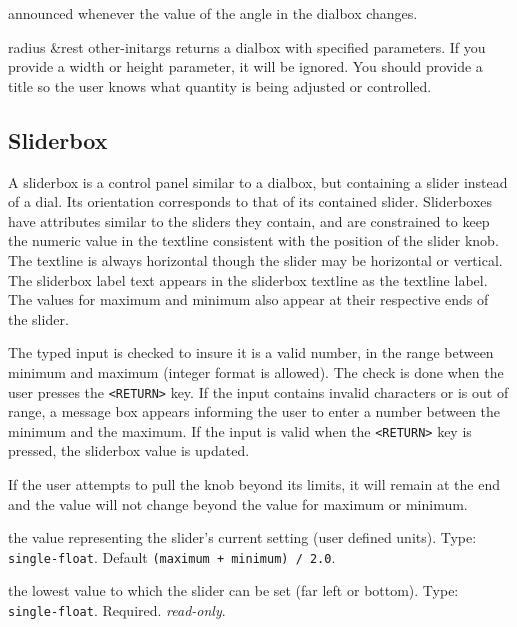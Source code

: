\documentclass[twoside,openright,11pt]{report}
\newcommand{\tp}[1]{\texttt{#1}}
\begin{document}

{announced whenever the value of the angle in the dialbox changes.}


{radius \&rest other-initargs}
{returns a dialbox with specified parameters.  If you provide a width
or height parameter, it will be ignored.  You should provide a title
so the user knows what quantity is being adjusted or controlled.}

\subsection{Sliderbox}

A sliderbox is a control panel similar to a dialbox,
but containing a slider instead of a dial.  Its orientation
corresponds to that of its contained slider.  Sliderboxes have
attributes similar to the sliders they contain, and are constrained to
keep the numeric value in the textline consistent with the position of
the slider knob.  The textline is always horizontal though the slider
may be horizontal or vertical.  The sliderbox label text appears in
the sliderbox textline as the textline label.  The values for maximum
and minimum also appear at their respective ends of the slider.

The typed input is checked to insure it is a valid number, in the
range between minimum and maximum (integer format is allowed).  The
check is done when the user presses the \tp{<RETURN>} key.  If the
input contains invalid characters or is out of range, a message box
appears informing the user to enter a number between the minimum and
the maximum.  If the input is valid when the \tp{<RETURN>} key is
pressed, the sliderbox value is updated.

If the user attempts to pull the knob beyond its limits, it will
remain at the end and the value will not change beyond the value for
maximum or minimum.


{the value representing the slider's current setting (user defined
units).  Type: \tp{single-float}. Default \tp{(maximum + minimum) /
2.0}.}

{the lowest value to which the slider can be set (far left or bottom).
Type: \tp{single-float}.  Required.  \emph{read-only}.}
\end{document}
